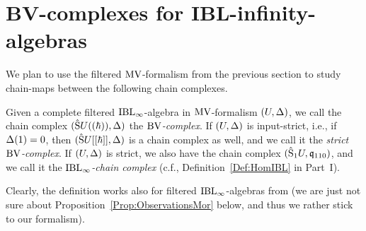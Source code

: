 \documentclass[\MainFolder/Text.tex]{subfiles}
\begin{document}
\section{BV-complexes for IBL-infinity-algebras}\label{Sec:BVCompl}

We plan to use the filtered $\mathrm{MV}$-formalism from the previous section to study chain-maps between the following chain complexes.

\begin{Definition}\label{Def:BVCompl}
Given a complete filtered $\mathrm{IBL}_\infty$-algebra in $\mathrm{MV}$-formalism $(U,\operatorname{\Delta})$, we call the chain complex $(\hat{\mathrm{S}}U((\hbar)),\operatorname{\Delta})$ the \emph{$\mathrm{BV}$-complex}. If $(U,\operatorname{\Delta})$ is input-strict, i.e., if $\operatorname{\Delta}(1) = 0$, then $(\hat{\mathrm{S}}U[[\hbar]],\operatorname{\Delta})$ is a chain complex as well, and we call it the \emph{strict $\mathrm{BV}$-complex}. If $(U,\operatorname{\Delta})$ is strict, we also have the chain complex $(\hat{\mathrm{S}}_1 U, \mathfrak{q}_{110})$, and we call it the \emph{$\mathrm{IBL}_\infty$-chain complex} (c.f., Definition~\ref{Def:HomIBL} in Part~I).
\end{Definition}

Clearly, the definition works also for filtered $\mathrm{IBL}_\infty$-algebras from \cite{Cieliebak2015} (we are just not sure about Proposition~\ref{Prop:ObservationsMor} below, and thus we rather stick to our formalism).
\end{document}
